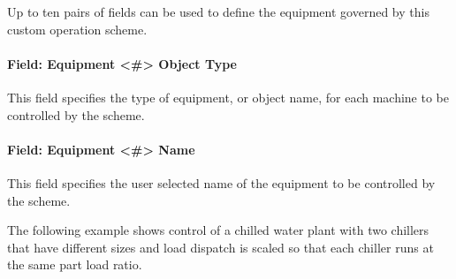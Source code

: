 Up to ten pairs of fields can be used to define the equipment governed by this custom operation scheme.

\paragraph{Field: Equipment \textless{}\#\textgreater{} Object Type}\label{field-equipment-object-type-000}

This field specifies the type of equipment, or object name, for each machine to be controlled by the scheme.

\paragraph{Field: Equipment \textless{}\#\textgreater{} Name}\label{field-equipment-name-000}

This field specifies the user selected name of the equipment to be controlled by the scheme.

The following example shows control of a chilled water plant with two chillers that have different sizes and load dispatch is scaled so that each chiller runs at the same part load ratio.

